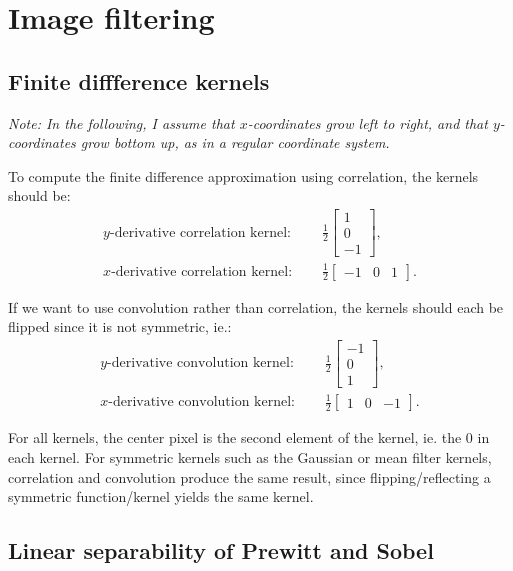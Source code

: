 \newcommand{\infint}{\int\limits_{-\infty}^\infty}
\section{Image filtering}

\subsection{Finite diffference kernels}

\emph{Note: In the following, I assume that $x$-coordinates grow left to right,
and that $y$-coordinates grow bottom up, as in a regular coordinate system.}

To compute the finite difference approximation using correlation, the kernels
should be:
\begin{align*}
  y\text{-derivative correlation kernel: }&\quad
  \frac 1 2
  \begin{bmatrix}
    1\\
    0\\
   -1
  \end{bmatrix},\\
  x\text{-derivative correlation kernel: }&\quad
  \frac 1 2
  \begin{bmatrix}
    -1 & 0 & 1
  \end{bmatrix}.
\end{align*}

If we want to use convolution rather than correlation, the kernels should each
be flipped since it is not symmetric, ie.:
\begin{align*}
  y\text{-derivative convolution kernel: }&\quad
  \frac 1 2
  \begin{bmatrix}
    -1\\
     0\\
     1
  \end{bmatrix},\\
  x\text{-derivative convolution kernel: }&\quad
  \frac 1 2
  \begin{bmatrix}
    1 & 0 & -1
  \end{bmatrix}.
\end{align*}

For all kernels, the center pixel is the second element of the kernel, ie. the 0
in each kernel. For symmetric kernels such as the Gaussian or mean filter
kernels, correlation and convolution produce the same result, since
flipping/reflecting a symmetric function/kernel yields the same kernel.

\newpage
\subsection{Linear separability of Prewitt and Sobel}

